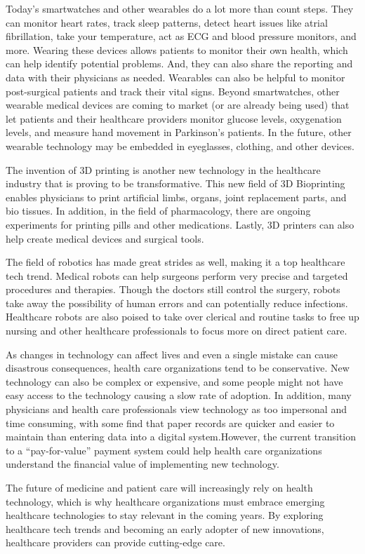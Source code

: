 \documentclass[12pt]{article}
\begin{document}
\indent

Today’s smartwatches and other wearables do a lot more than count steps. They can monitor heart rates, track sleep patterns, detect heart issues like atrial fibrillation, take your temperature, act as ECG and blood pressure monitors, and more. Wearing these devices allows patients to monitor their own health, which can help identify potential problems. And, they can also share the reporting and data with their physicians as needed. Wearables can also be helpful to monitor post-surgical patients and track their vital signs. Beyond smartwatches, other wearable medical devices are coming to market (or are already being used) that let patients and their healthcare providers monitor glucose levels, oxygenation levels, and measure hand movement in Parkinson’s patients. In the future, other wearable technology may be embedded in eyeglasses, clothing, and other devices.

\indent

The invention of 3D printing is another new technology in the healthcare industry that is proving to be transformative. This new field of 3D Bioprinting enables physicians to print artificial limbs, organs, joint replacement parts, and bio tissues. In addition, in the field of pharmacology, there are ongoing experiments for printing pills and other medications. Lastly, 3D printers can also help create medical devices and surgical tools.

\indent

The field of robotics has made great strides as well, making it a top healthcare tech trend. Medical robots can help surgeons perform very precise and targeted procedures and therapies. Though the doctors still control the surgery, robots take away the possibility of human errors and can potentially reduce infections. Healthcare robots are also poised to take over clerical and routine tasks to free up nursing and other healthcare professionals to focus more on direct patient care.

\indent

As changes in technology can affect lives and even a single mistake can cause disastrous consequences, health care organizations tend to be conservative. New technology can also be complex or expensive, and some people might not have easy access to the technology causing a slow rate of adoption. In addition, many physicians and health care professionals view technology as too impersonal and time consuming, with some find that paper records are quicker and easier to maintain than entering data into a digital system.However, the current transition to a “pay-for-value” payment system could help health care organizations understand the financial value of implementing new technology.

\indent

The future of medicine and patient care will increasingly rely on health technology, which is why healthcare organizations must embrace emerging healthcare technologies to stay relevant in the coming years. By exploring healthcare tech trends and becoming an early adopter of new innovations, healthcare providers can provide cutting-edge care.
\end{document}
